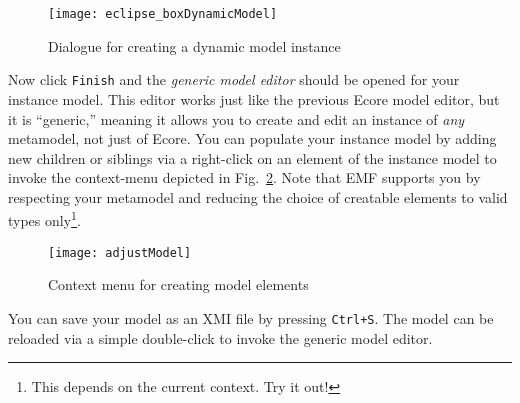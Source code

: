 \begin{figure}[htbp]
	\centering
  \texttt{[image: eclipse\_boxDynamicModel]}
	\caption{Dialogue for creating a dynamic model instance}
	\label{fig:store_dynamic_instance}
\end{figure}

Now click \texttt{Finish} and the \emph{generic model editor} should be opened for your instance model.
This editor works just like the previous Ecore model editor, but it is ``generic,'' meaning it allows you to create and edit an instance of \emph{any} metamodel, not just of Ecore.
You can populate your instance model by adding new children or siblings via a right-click on an element of the instance model to invoke the context-menu depicted in Fig.~\ref{fig:create_instance}.
Note that EMF supports you by respecting your metamodel and reducing the choice of creatable elements to valid types only\footnote{This depends on the current context. Try it out!}.

\begin{figure}[htbp]
	\centering
  \texttt{[image: adjustModel]}
	\caption{Context menu for creating model elements}
	\label{fig:create_instance}
\end{figure}

You can save your model as an XMI file by pressing \texttt{Ctrl+S}.
The model can be reloaded via a simple double-click to invoke the generic model editor.

